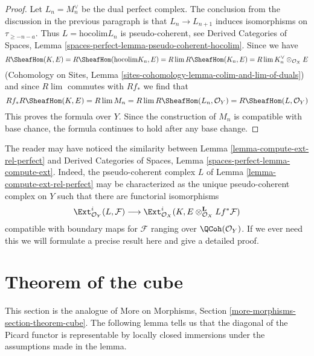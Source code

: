 \begin{proof}
\medskip\noindent
Let $L_n = M_n^\vee$ be the dual perfect complex. The
conclusion from the discussion in the previous paragraph is that
$L_n \to L_{n + 1}$ induces isomorphisms on $\tau_{\geq -n - a}$.
Thus $L = \text{hocolim} L_n$ is pseudo-coherent, see
Derived Categories of Spaces, Lemma
\ref{spaces-perfect-lemma-pseudo-coherent-hocolim}.
Since we have
$$
R\SheafHom(K, E) = R\SheafHom(\text{hocolim} K_n, E) =
R\lim R\SheafHom(K_n, E) = R\lim K_n^\vee \otimes_{\mathcal{O}_X} E
$$
(Cohomology on Sites, Lemma
\ref{sites-cohomology-lemma-colim-and-lim-of-duals})
and since $R\lim$ commutes with $Rf_*$ we find that
$$
Rf_*R\SheafHom(K, E) = R\lim M_n = R\lim R\SheafHom(L_n, \mathcal{O}_Y) =
R\SheafHom(L, \mathcal{O}_Y)
$$
This proves the formula over $Y$. Since the construction of $M_n$ is
compatible with base chance, the formula continues to hold after
any base change.
\end{proof}

\begin{remark}
\label{remark-compare-L}
The reader may have noticed the similarity between
Lemma \ref{lemma-compute-ext-rel-perfect} and
Derived Categories of Spaces, Lemma \ref{spaces-perfect-lemma-compute-ext}.
Indeed, the pseudo-coherent complex $L$ of
Lemma \ref{lemma-compute-ext-rel-perfect}
may be characterized as the unique pseudo-coherent complex
on $Y$ such that there are functorial isomorphisms
$$
\Ext^i_{\mathcal{O}_Y}(L, \mathcal{F}) \longrightarrow
\Ext^i_{\mathcal{O}_X}(K,
E \otimes_{\mathcal{O}_X}^\mathbf{L} Lf^*\mathcal{F})
$$
compatible with boundary maps for $\mathcal{F}$ ranging over
$\QCoh(\mathcal{O}_Y)$. If we ever need this we will
formulate a precise result here and give a detailed proof.
\end{remark}














\section{Theorem of the cube}
\label{section-theorem-cube}

\noindent
This section is the analogue of More on Morphisms, Section
\ref{more-morphisms-section-theorem-cube}.
The following lemma tells us that the diagonal of the Picard
functor is representable by locally closed immersions under
the assumptions made in the lemma.

